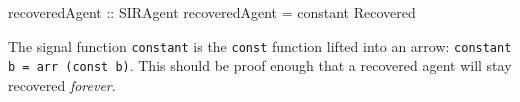 \begin{HaskellCode}
recoveredAgent :: SIRAgent
recoveredAgent = constant Recovered
\end{HaskellCode}

The signal function \texttt{constant} is the \texttt{const} function lifted into an arrow: \texttt{constant b = arr (const b)}. This should be proof enough that a recovered agent will stay recovered \textit{forever}. %